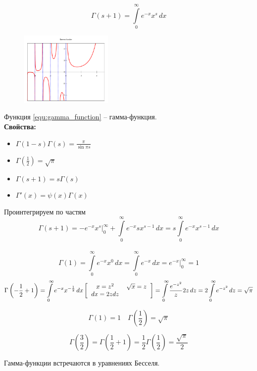 \begin{equation}
    \Gamma(s + 1) = \int\limits_0^{\infty} e^{- x} x^s \, dx
	\label{equ:gamma_function}
\end{equation}


\begin{figure}
	\centering
	\includegraphics[width=0.4\textwidth]{Gamma_plot.pdf}

\end{figure}


Функция \eqref{equ:gamma_function} -- гамма-функция.\\
\textbf{Свойства:}
\begin{itemize}
	\item $\displaystyle\Gamma(1 - s) \Gamma(s) = \frac{\pi}{\sin \pi s}$
	\item $\displaystyle\Gamma\left(\frac{1}{2} \right) = \sqrt{\pi}$
	\item $\displaystyle\Gamma(s + 1) = s \Gamma(s)$
	\item  $\displaystyle \Gamma'(x) = \psi(x) \Gamma(x)$ 
\end{itemize}
Проинтегрируем по частям
\[
    \Gamma(s + 1) = - e^{-x} x^s |_0^{\infty} + \int\limits_0^{\infty} e^{-x} s x^{s - 1} \, dx = s \int\limits_0^{\infty} e^{-x} x ^{s - 1} \, dx
\]\\

\[
    \Gamma(1) = \int\limits_0^{\infty} e^{- x} x^0 \, dx = \int\limits_0^{\infty} e^{-x} \, dx = \left. e^{- x} \right|_0^{\infty} = 1
\]
\vspace{0.2in}
\[
    \Gamma \left(- \frac{1}{2} + 1\right) = \int\limits_0^{\infty} e^{-x} x^{- \frac{1}{2}} \, dx \left[ \begin{tabular}{c c} $x = z^2$ & $\sqrt{x} = z$\\ $dx = 2z dz$& \end{tabular} \right] = \int\limits_0^{\infty} \frac{e^{-z^2}}{z} 2 z \, dz = 2 \int\limits_0^{\infty} e^{-z^2} \, dz =\sqrt{\pi}
\]

\[
    \Gamma(1) = 1 \quad \Gamma\left(\frac{1}{2}\right) = \sqrt{\pi}
\]

\[
    \Gamma\left(\frac{3}{2}\right) = \Gamma\left(\frac{1}{2} + 1\right) = \frac{1}{2} \Gamma\left(\frac{1}{2}\right) = \frac{\sqrt{\pi}}{2}
\]

Гамма-функции встречаются в уравнениях Бесселя.



